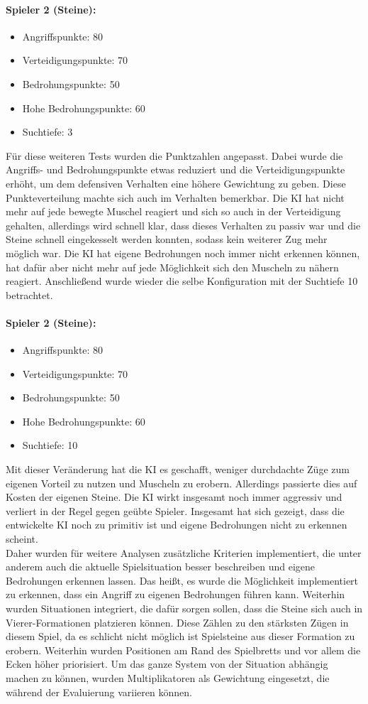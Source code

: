 \paragraph{Spieler 2 (Steine):}
\begin{itemize}
	\item Angriffspunkte: 80
	\item Verteidigungspunkte: 70
	\item Bedrohungspunkte: 50
	\item Hohe Bedrohungspunkte: 60
	\item Suchtiefe: 3
\end{itemize}
Für diese weiteren Tests wurden die Punktzahlen angepasst. Dabei wurde die Angriffs- und Bedrohungspunkte etwas reduziert und die Verteidigungspunkte erhöht, um dem defensiven Verhalten eine höhere Gewichtung zu geben. Diese Punkteverteilung machte sich auch im Verhalten bemerkbar. Die KI hat nicht mehr auf jede bewegte Muschel reagiert und sich so auch in der Verteidigung gehalten, allerdings wird schnell klar, dass dieses Verhalten zu passiv war und die Steine schnell eingekesselt werden konnten, sodass kein weiterer Zug mehr möglich war. Die KI hat eigene Bedrohungen noch immer nicht erkennen können, hat dafür aber nicht mehr auf jede Möglichkeit sich den Muscheln zu nähern reagiert. Anschließend wurde wieder die selbe Konfiguration mit der Suchtiefe 10 betrachtet.

\paragraph{Spieler 2 (Steine):}
\begin{itemize}
	\item Angriffspunkte: 80
	\item Verteidigungspunkte: 70
	\item Bedrohungspunkte: 50
	\item Hohe Bedrohungspunkte: 60
	\item Suchtiefe: 10
\end{itemize}
Mit dieser Veränderung hat die KI es geschafft, weniger durchdachte Züge zum eigenen Vorteil zu nutzen und Muscheln zu erobern. Allerdings passierte dies auf Kosten der eigenen Steine. Die KI wirkt insgesamt noch immer aggressiv und verliert in der Regel gegen geübte Spieler. Insgesamt hat sich gezeigt, dass die entwickelte KI noch zu primitiv ist und eigene Bedrohungen nicht zu erkennen scheint.\\
Daher wurden für weitere Analysen zusätzliche Kriterien implementiert, die unter anderem auch die aktuelle Spielsituation besser beschreiben und eigene Bedrohungen erkennen lassen. Das heißt, es wurde die Möglichkeit implementiert zu erkennen, dass ein Angriff zu eigenen Bedrohungen führen kann. Weiterhin wurden Situationen integriert, die dafür sorgen sollen, dass die Steine sich auch in Vierer-Formationen platzieren können. Diese Zählen zu den stärksten Zügen in diesem Spiel, da es schlicht nicht möglich ist Spielsteine aus dieser Formation zu erobern. Weiterhin wurden Positionen am Rand des Spielbretts und vor allem die Ecken höher priorisiert. Um das ganze System von der Situation abhängig machen zu können, wurden Multiplikatoren als Gewichtung eingesetzt, die während der Evaluierung variieren können.
